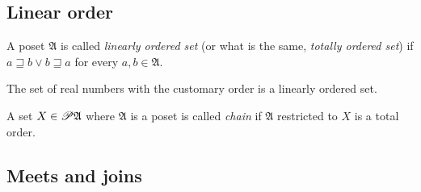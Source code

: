 \subsection{Linear order}
\begin{defn}
A poset $\mathfrak{A}$ is called \emph{linearly
ordered set} (or what is the same, \emph{totally ordered set}) if
$a\sqsupseteq b\lor b\sqsupseteq a$ for every $a,b\in\mathfrak{A}$.\end{defn}
\begin{example}
The set of real numbers with the customary order is a linearly ordered
set.\end{example}
\begin{defn}
A set $X\in\mathscr{P}\mathfrak{A}$ where $\mathfrak{A}$
is a poset is called \emph{chain} if $\mathfrak{A}$ restricted to
$X$ is a total order.
\end{defn}

\subsection{Meets and joins}

